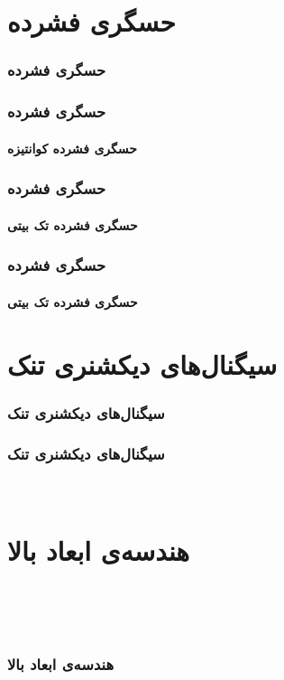 \begin{frame}
\tableofcontents
\end{frame}


\section{حسگری فشرده\hfill}

\begin{frame}
\frametitle{حسگری فشرده}

\end{frame}

\begin{frame}
\frametitle{حسگری فشرده}
\framesubtitle{حسگری فشرده کوانتیزه}
\end{frame}

\begin{frame}
\frametitle{حسگری فشرده}
\framesubtitle{حسگری فشرده تک بیتی}
\end{frame}

\begin{frame}
\frametitle{حسگری فشرده}
\framesubtitle{حسگری فشرده تک بیتی}
\end{frame}


\section{سیگنال‌های دیکشنری تنک\hfill}

\begin{frame}
\frametitle{سیگنال‌های دیکشنری تنک}

\end{frame}

\begin{frame}
\frametitle{سیگنال‌های دیکشنری تنک}

\end{frame}
‎%
‎%
‎%

\section{هندسه‌ی ابعاد بالا‎\hfill}‎
‎
‎\begin{frame}‎
\frametitle{هندسه‌ی ابعاد بالا}

‎\end{frame}‎‎

